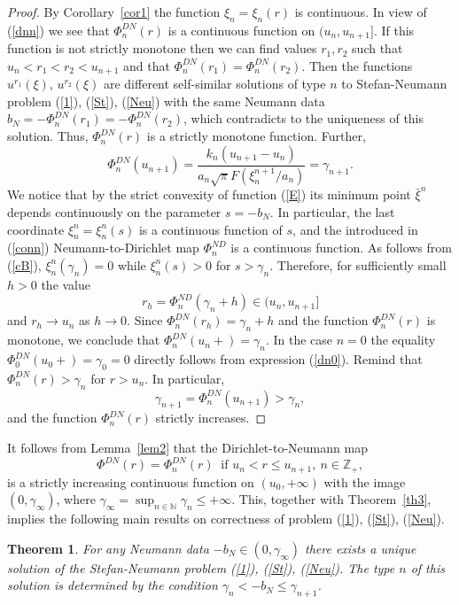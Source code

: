 \documentclass[10pt,a4paper]{amsart}
\newtheorem{theorem}{Theorem}[section]
\numberwithin{equation}{section}
\newcommand{\N}{{\mathbb N}}
\newcommand{\Z}{{\mathbb Z}}
\begin{document}
\begin{proof}
By Corollary~\ref{cor1} the function $\xi_n=\xi_n(r)$ is continuous. In view of (\ref{dnn}) we see that $\Phi^{DN}_n(r)$ is a continuous function on $(u_n,u_{n+1}]$. If this function is not strictly monotone then we can find values $r_1,r_2$ such that $u_n<r_1<r_2<u_{n+1}$ and that $\Phi^{DN}_n(r_1)=\Phi^{DN}_n(r_2)$. Then the functions $u^{r_1}(\xi)$, $u^{r_2}(\xi)$ are different self-similar solutions of type $n$ to Stefan-Neumann problem (\ref{1}), (\ref{St}), (\ref{Neu}) with the same Neumann data $b_N=-\Phi^{DN}_n(r_1)=-\Phi^{DN}_n(r_2)$, which contradicts to the uniqueness of this solution. Thus, $\Phi^{DN}_n(r)$ is a strictly monotone function. Further,
\[\Phi^{DN}_n(u_{n+1})=\frac{k_n(u_{n+1}-u_n)}{a_n\sqrt{\pi}F(\xi^{n+1}_n/a_n)}=\gamma_{n+1}.\]
We notice that by the strict convexity of function (\ref{E}) its minimum point $\bar\xi^n$ depends continuously on the parameter $s=-b_N$. In  particular, the last coordinate $\xi_n^n=\xi_n^n(s)$ is a continuous function of $s$, and the introduced in (\ref{conn}) Neumann-to-Dirichlet map $\Phi^{ND}_n$ is a continuous function. As follows from (\ref{cB}),   $\xi_n^n(\gamma_n)=0$ while $\xi_n^n(s)>0$ for $s>\gamma_n$. Therefore, for sufficiently small $h>0$ the value $$r_h=\Phi^{ND}_n(\gamma_n+h)\in (u_n,u_{n+1}]$$ and $r_h\to u_n$ as $h\to 0$. Since $\Phi^{DN}_n(r_h)=\gamma_n+h$ and the function $\Phi^{DN}_n(r)$ is monotone, we conclude that $\Phi^{DN}_n(u_n+)=\gamma_n$. In the case $n=0$ the equality ${\Phi^{DN}_0(u_0+)=\gamma_0=0}$ directly follows from expression (\ref{dn0}). Remind that $\Phi^{DN}_n(r)>\gamma_n$ for $r>u_n$. In particular,
\[\gamma_{n+1}=\Phi^{DN}_n(u_{n+1})>\gamma_n,\] and the function $\Phi^{DN}_n(r)$ strictly increases.
\end{proof}

It follows from Lemma~\ref{lem2} that the Dirichlet-to-Neumann map
\begin{equation}\label{mapDN}
\Phi^{DN}(r)=\Phi^{DN}_n(r) \ \mbox{ if } u_n<r\le u_{n+1}, \ n\in\Z_+,
\end{equation}
is a strictly increasing continuous function on $(u_0,+\infty)$ with the image $(0,\gamma_\infty)$, where
$\gamma_\infty=\sup_{n\in\N}\gamma_n\le +\infty$. This, together with Theorem~\ref{th3}, implies
the following main results on correctness of problem (\ref{1}), (\ref{St}), (\ref{Neu}).

\begin{theorem}\label{th5} For any Neumann data $-b_N\in (0,\gamma_\infty)$ there exists a unique solution of the Stefan-Neumann problem
(\ref{1}), (\ref{St}), (\ref{Neu}). The type $n$ of this solution is determined by the condition $\gamma_n<-b_N\le\gamma_{n+1}$.
\end{theorem}
\end{document}
